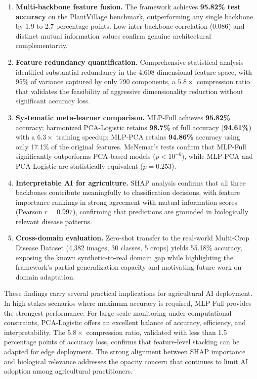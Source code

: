 \documentclass[pdflatex,sn-basic]{sn-jnl}
\begin{document}
\begin{enumerate}
    \item \textbf{Multi-backbone feature fusion.} The framework achieves \textbf{95.82\% test accuracy} on the PlantVillage benchmark, outperforming any single backbone by 1.9 to 2.7 percentage points. Low inter-backbone correlation (0.086) and distinct mutual information values confirm genuine architectural complementarity.

    \item \textbf{Feature redundancy quantification.} Comprehensive statistical analysis identified substantial redundancy in the 4,608-dimensional feature space, with 95\% of variance captured by only 790 components, a $5.8\times$ compression ratio that validates the feasibility of aggressive dimensionality reduction without significant accuracy loss.

    \item \textbf{Systematic meta-learner comparison.} MLP-Full achieves \textbf{95.82\%} accuracy; harmonized PCA-Logistic retains \textbf{98.7\%} of full accuracy (\textbf{94.61\%}) with a $6.3\times$ training speedup; MLP-PCA retains \textbf{94.86\%} accuracy using only 17.1\% of the original features. McNemar's tests confirm that MLP-Full significantly outperforms PCA-based models ($p < 10^{-6}$), while MLP-PCA and PCA-Logistic are statistically equivalent ($p = 0.253$).

    \item \textbf{Interpretable AI for agriculture.} SHAP analysis confirms that all three backbones contribute meaningfully to classification decisions, with feature importance rankings in strong agreement with mutual information scores (Pearson $r = 0.997$), confirming that predictions are grounded in biologically relevant disease patterns.

    \item \textbf{Cross-domain evaluation.} Zero-shot transfer to the real-world Multi-Crop Disease Dataset (4,382 images, 30 classes, 5 crops) yields 55.18\% accuracy, exposing the known synthetic-to-real domain gap while highlighting the framework's partial generalization capacity and motivating future work on domain adaptation.
\end{enumerate}

These findings carry several practical implications for agricultural AI deployment. In high-stakes scenarios where maximum accuracy is required, MLP-Full provides the strongest performance. For large-scale monitoring under computational constraints, PCA-Logistic offers an excellent balance of accuracy, efficiency, and interpretability. The $5.8\times$ compression ratio, validated with less than 1.5 percentage points of accuracy loss, confirms that feature-level stacking can be adapted for edge deployment. The strong alignment between SHAP importance and biological relevance addresses the opacity concern that continues to limit AI adoption among agricultural practitioners.
\end{document}
